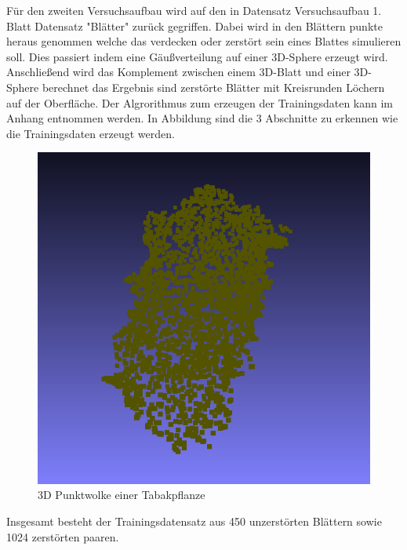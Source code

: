 \documentclass{llncs}
\begin{document}
Für den zweiten Versuchsaufbau wird auf den in Datensatz Versuchsaufbau 1. Blatt Datensatz "Blätter" zurück gegriffen. Dabei wird in den Blättern punkte heraus genommen welche das verdecken oder zerstört sein eines Blattes simulieren soll. Dies passiert indem eine Gäußverteilung auf einer 3D-Sphere erzeugt wird. Anschließend wird das Komplement zwischen einem 3D-Blatt und einer 3D-Sphere berechnet das Ergebnis sind zerstörte Blätter mit Kreisrunden Löchern auf der Oberfläche. Der Algrorithmus zum erzeugen der Trainingsdaten kann im Anhang entnommen werden. In Abbildung sind die 3 Abschnitte zu erkennen wie die Trainingsdaten erzeugt werden. 
\begin{figure}[htbp] 
	\centering
	\includegraphics[width=1.2\textwidth]{leaf1.png}
	\caption{3D Punktwolke einer Tabakpflanze}
	\label{fig:Bild2}
\end{figure}

Insgesamt besteht der Trainingsdatensatz aus 450 unzerstörten Blättern sowie 1024 zerstörten paaren. 
\end{document}
